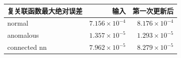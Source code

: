 \begin{tabular}{lrr}
\toprule
复关联函数最大绝对误差 & 输入 & 第一次更新后 \\
\midrule
normal & $7.156\times10^{-4}$ & $8.176\times10^{-4}$ \\
anomalous & $1.357\times10^{-5}$ & $1.293\times10^{-5}$ \\
connected nn & $7.962\times10^{-5}$ & $8.279\times10^{-5}$ \\
\bottomrule
\end{tabular}
